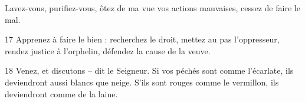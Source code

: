 Lavez-vous, purifiez-vous, ôtez de ma vue vos actions mauvaises, cessez de faire le mal.

17 Apprenez à faire le bien : recherchez le droit, mettez au pas l’oppresseur, rendez justice à l’orphelin, défendez la cause de la veuve.

18 Venez, et discutons – dit le Seigneur. Si vos péchés sont comme l’écarlate, ils deviendront aussi blancs que neige. S’ils sont rouges comme le vermillon, ils deviendront comme de la laine.
